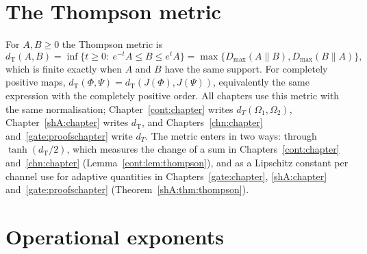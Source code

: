 \section{The Thompson metric}\label{nt:sec:thompson}

For $A,B\ge0$ the Thompson metric is
\[
d_{\mathrm T}(A,B)=\inf\{t\ge0:\ e^{-t}A\le B\le e^{t}A\}=\max\{D_{\max}(A\|B),D_{\max}(B\|A)\},
\]
which is finite exactly when $A$ and $B$ have the same support. For completely positive maps, $d_{\mathrm T}(\Phi,\Psi)=d_{\mathrm T}(J(\Phi),J(\Psi))$, equivalently the same expression with the completely positive order. All chapters use this metric with the same normalisation; Chapter~\ref{cont:chapter} writes $d_T(\Omega_1,\Omega_2)$, Chapter~\ref{shA:chapter} writes $d_{\mathrm T}$, and Chapters~\ref{chn:chapter} and~\ref{gate:proofschapter} write $d_T$. The metric enters in two ways: through $\tanh(d_{\mathrm T}/2)$, which measures the change of a sum in Chapters~\ref{cont:chapter} and~\ref{chn:chapter} (Lemma~\ref{cont:lem:thompson}), and as a Lipschitz constant per channel use for adaptive quantities in Chapters~\ref{gate:chapter}, \ref{shA:chapter} and~\ref{gate:proofschapter} (Theorem~\ref{shA:thm:thompson}).

\section{Operational exponents}\label{nt:sec:exponents}

